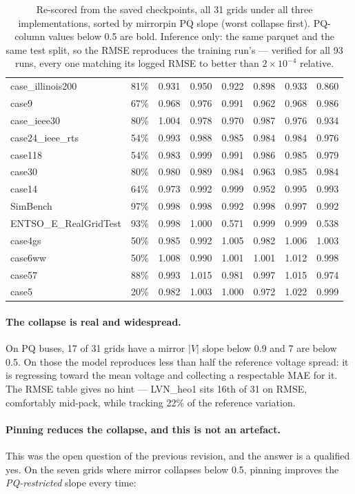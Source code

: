 \documentclass[10pt]{article}
\begin{document}
\begin{table}[H]
\begin{tabular}{lrrrrrrr}
case\_illinois200 & 81\% & 0.931 & 0.950 & 0.922 & 0.898 & 0.933 & 0.860 \\
case9 & 67\% & 0.968 & 0.976 & 0.991 & 0.962 & 0.968 & 0.986 \\
case\_ieee30 & 80\% & 1.004 & 0.978 & 0.970 & 0.987 & 0.976 & 0.934 \\
case24\_ieee\_rts & 54\% & 0.993 & 0.988 & 0.985 & 0.984 & 0.984 & 0.976 \\
case118 & 54\% & 0.983 & 0.999 & 0.991 & 0.986 & 0.985 & 0.979 \\
case30 & 80\% & 0.980 & 0.989 & 0.984 & 0.963 & 0.985 & 0.984 \\
case14 & 64\% & 0.973 & 0.992 & 0.999 & 0.952 & 0.995 & 0.993 \\
SimBench & 97\% & 0.998 & 0.998 & 0.992 & 0.998 & 0.997 & 0.992 \\
ENTSO\_E\_RealGridTest & 93\% & 0.998 & 1.000 & 0.571 & 0.999 & 0.999 & 0.538 \\
case4gs & 50\% & 0.985 & 0.992 & 1.005 & 0.982 & 1.006 & 1.003 \\
case6ww & 50\% & 1.008 & 0.990 & 1.001 & 1.001 & 1.012 & 0.998 \\
case57 & 88\% & 0.993 & 1.015 & 0.981 & 0.997 & 1.015 & 0.974 \\
case5 & 20\% & 0.982 & 1.003 & 1.000 & 0.972 & 1.022 & 0.999 \\
\bottomrule
\end{tabular}
\caption{Re-scored from the saved checkpoints, all 31 grids under all three
implementations, sorted by mirrorpin PQ slope (worst collapse first). PQ-column
values below 0.5 are bold. Inference only: the same parquet and the same test
split, so the RMSE reproduces the training run's --- verified for all 93 runs,
every one matching its logged RMSE to better than $2\times10^{-4}$ relative.}
\end{table}

\paragraph{The collapse is real and widespread.} On PQ buses, 17 of 31 grids
have a mirror $|V|$ slope below 0.9 and 7 are below 0.5. On those the model
reproduces less than half the reference voltage spread: it is regressing toward
the mean voltage and collecting a respectable MAE for it. The RMSE table gives
no hint --- LVN\_heo1 sits 16th of 31 on RMSE, comfortably mid-pack, while
tracking 22\% of the reference variation.

\paragraph{Pinning reduces the collapse, and this is not an artefact.} This was
the open question of the previous revision, and the answer is a qualified yes.
On the seven grids where mirror collapses below 0.5, pinning improves the
\emph{PQ-restricted} slope every time:
\end{document}
